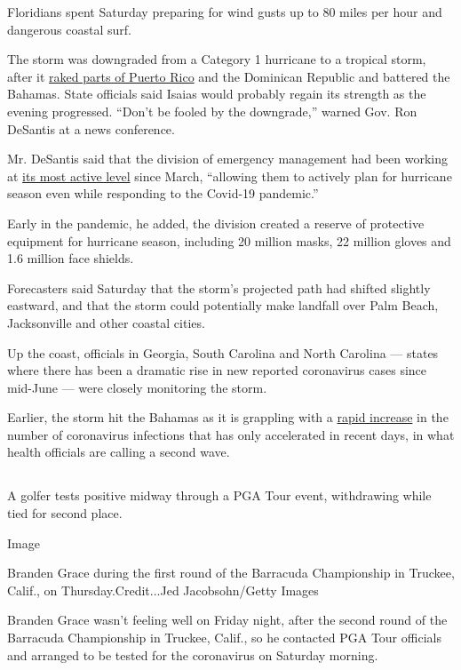 Floridians spent Saturday preparing for wind gusts up to 80 miles per
hour and dangerous coastal surf.

The storm was downgraded from a Category 1 hurricane to a tropical
storm, after it
\href{https://www.nytimes.com/2020/07/31/us/hurricane-isaias.html}{raked
parts of Puerto Rico} and the Dominican Republic and battered the
Bahamas. State officials said Isaias would probably regain its strength
as the evening progressed. ``Don't be fooled by the downgrade,'' warned
Gov. Ron DeSantis at a news conference.

Mr. DeSantis said that the division of emergency management had been
working at
\href{https://www.floridadisaster.org/sert/eoc-activation-levels/}{its
most active level} since March, ``allowing them to actively plan for
hurricane season even while responding to the Covid-19 pandemic.''

Early in the pandemic, he added, the division created a reserve of
protective equipment for hurricane season, including 20 million masks,
22 million gloves and 1.6 million face shields.

Forecasters said Saturday that the storm's projected path had shifted
slightly eastward, and that the storm could potentially make landfall
over Palm Beach, Jacksonville and other coastal cities.

Up the coast, officials in Georgia, South Carolina and North Carolina
--- states where there has been a dramatic rise in new reported
coronavirus cases since mid-June --- were closely monitoring the storm.

Earlier, the storm hit the Bahamas as it is grappling with a
\href{https://www.nytimes.com/2020/07/04/world/americas/virus-caribbean-hurricane.html}{rapid
increase} in the number of coronavirus infections that has only
accelerated in recent days, in what health officials are calling a
second wave.

\hypertarget{-6}{%
\subsection{}\label{-6}}

A golfer tests positive midway through a PGA Tour event, withdrawing
while tied for second place.

Image

Branden Grace during the first round of the Barracuda Championship in
Truckee, Calif., on Thursday.Credit...Jed Jacobsohn/Getty Images

Branden Grace wasn't feeling well on Friday night, after the second
round of the Barracuda Championship in Truckee, Calif., so he contacted
PGA Tour officials and arranged to be tested for the coronavirus on
Saturday morning.

